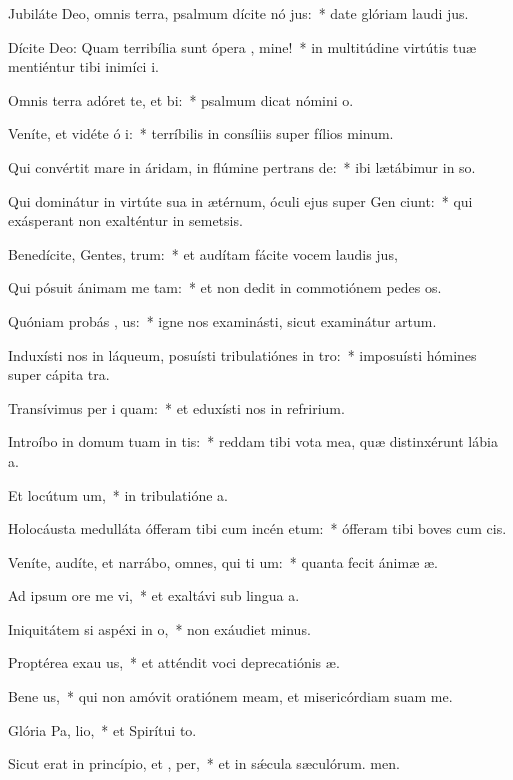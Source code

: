 \item Jubiláte Deo, omnis terra, psalmum dícite nó jus:~* date glóriam laudi jus.
\item Dícite Deo: Quam terribília sunt ópera , mine!~* in multitúdine virtútis tuæ mentiéntur tibi inimíci i.
\item Omnis terra adóret te, et  bi:~* psalmum dicat nómini o.
\item Veníte, et vidéte ó i:~* terríbilis in consíliis super fílios minum.
\item Qui convértit mare in áridam, in flúmine pertrans de:~* ibi lætábimur in so.
\item Qui dominátur in virtúte sua in ætérnum, óculi ejus super Gen ciunt:~* qui exásperant non exalténtur in semetsis.
\item Benedícite, Gentes,  trum:~* et audítam fácite vocem laudis jus,
\item Qui pósuit ánimam me  tam:~* et non dedit in commotiónem pedes os.
\item Quóniam probás , us:~* igne nos examinásti, sicut examinátur artum.
\item Induxísti nos in láqueum, posuísti tribulatiónes in  tro:~* imposuísti hómines super cápita tra.
\item Transívimus per i  quam:~* et eduxísti nos in refririum.
\item Introíbo in domum tuam in tis:~* reddam tibi vota mea, quæ distinxérunt lábia a.
\item Et locútum   um,~* in tribulatióne a.
\item Holocáusta medulláta ófferam tibi cum incén etum:~* ófferam tibi boves cum cis.
\item Veníte, audíte, et narrábo, omnes, qui ti um:~* quanta fecit ánimæ æ.
\item Ad ipsum ore me vi,~* et exaltávi sub lingua a.
\item Iniquitátem si aspéxi in  o,~* non exáudiet minus.
\item Proptérea exau us,~* et atténdit voci deprecatiónis æ.
\item Bene us,~* qui non amóvit oratiónem meam, et misericórdiam suam  me.
\item Glória Pa,  lio,~* et Spirítui to.
\item Sicut erat in princípio, et ,  per,~* et in sǽcula sæculórum. men.
